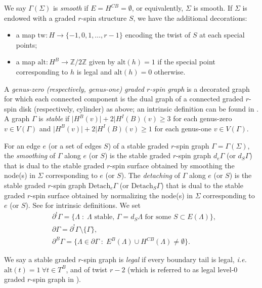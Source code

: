 \documentclass[11pt]{amsart}
\theoremstyle{definition}
\theoremstyle{remark}
\newcommand{\<}{\left<}
\renewcommand{\>}{\right>}
\numberwithin{equation}{section}
\begin{document}
We say $\Gamma(\Sigma)$ is \textit{smooth} if $E = H^{CB} = \emptyset$, or equivalently, $\Sigma$ is smooth.
If $\Sigma$ is endowed with a graded $r$-spin structure $S$, we have the additional decorations:
\begin{itemize}
    \item a map $\text{tw}: H \rightarrow \{-1,0,1,\ldots, r-1\}$ encoding the twist of $S$ at each special points;
    \item a map
$\text{alt}: H^B \rightarrow \mathbb{Z}/2\mathbb{Z}$
given by $\text{alt}(h) = 1$ if the special point corresponding to $h$ is legal and $\text{alt}(h) = 0$ otherwise.
\end{itemize}



A \textit{genus-zero (respectively, genus-one) graded $r$-spin graph} is a decorated graph for which each connected component is the dual graph of a connected graded $r$-spin disk (respectively, cylinder) as above; an intrinsic definition can be found in \cite[\S 3.2]{TZ1}. A graph $\Gamma$ is \textit{stable} if $\lvert H^B(v)\rvert +2\lvert H^I(B)(v)\ge 3$ for each genus-zero $v\in V(\Gamma)$ and $\lvert H^B(v)\rvert +2\lvert H^I(B)(v)\ge 1$ for each genus-one $v\in V(\Gamma)$.


For an edge $e$ (or a set of edges $S$) of a stable graded $r$-spin graph $\Gamma=\Gamma(\Sigma)$,  the \textit{smoothing} of $\Gamma$ along $e$ (or $S$) is the stable graded $r$-spin graph $d_e\Gamma$ (or $d_S \Gamma$) that is dual to the stable graded $r$-spin surface obtained by smoothing the node(s) in $\Sigma$ corresponding to $e$ (or $S$). The \textit{detaching} of $\Gamma$ along $e$ (or $S$) is the stable graded $r$-spin graph $\text{Detach}_e\Gamma$ (or $\text{Detach}_S\Gamma$) that is dual to the stable graded $r$-spin surface obtained by normalizing the node(s) in $\Sigma$ corresponding to $e$ (or $S$). See \cite[\S 3.2]{TZ1} for intrinsic definitions. We set
\begin{align*}
&\partial^!\Gamma = \{\Lambda \; \colon \; \Lambda \text{ stable, }\Gamma= d_S\Lambda \text{ for some } S\subset E(\Lambda)\},\\
&\partial \Gamma = \partial^!\Gamma \setminus \{\Gamma\},\\
&\partial^B \Gamma = \{\Lambda \in \partial \Gamma \; \colon \; E^B(\Lambda) \cup H^{CB}(\Lambda) \neq \emptyset\}.
\end{align*}


We say a stable graded $r$-spin graph is \textit{legal} if every boundary tail is legal, \textit{i.e.} ${\text{alt}}(t)=1~\forall t \in T^B$, and of twist $r-2$ (which is referred to as legal level-$0$ graded $r$-spin graph in \cite{BCT2}). 
\end{document}
